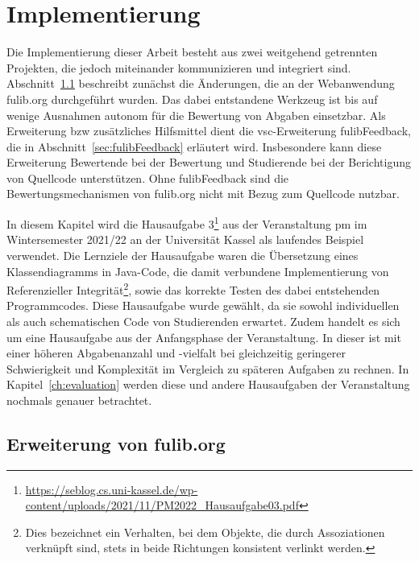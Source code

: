 \chapter{Implementierung}\label{ch:implementation}

Die Implementierung dieser Arbeit besteht aus zwei weitgehend getrennten Projekten, die jedoch miteinander kommunizieren und integriert sind.
Abschnitt~\ref{sec:expanding-fulib.org} beschreibt zunächst die Änderungen, die an der Webanwendung fulib.org durchgeführt wurden.
Das dabei entstandene Werkzeug ist bis auf wenige Ausnahmen autonom für die Bewertung von Abgaben einsetzbar.
Als Erweiterung \ac{bzw} zusätzliches Hilfsmittel dient die \ac{vsc}-Erweiterung fulibFeedback, die in Abschnitt~\ref{sec:fulibFeedback} erläutert wird.
Insbesondere kann diese Erweiterung Bewertende bei der Bewertung und Studierende bei der Berichtigung von Quellcode unterstützen.
Ohne fulibFeedback sind die Bewertungsmechanismen von fulib.org nicht mit Bezug zum Quellcode nutzbar.

In diesem Kapitel wird die Hausaufgabe 3\footnote{
    \url{https://seblog.cs.uni-kassel.de/wp-content/uploads/2021/11/PM2022_Hausaufgabe03.pdf}
} aus der Veranstaltung \ac{pm} im Wintersemester 2021/22 an der Universität Kassel als laufendes Beispiel verwendet.
Die Lernziele der Hausaufgabe waren die Übersetzung eines Klassendiagramms in Java-Code, die damit verbundene Implementierung von Referenzieller Integrität\footnote{
    Dies bezeichnet ein Verhalten, bei dem Objekte, die durch Assoziationen verknüpft sind, stets in beide Richtungen konsistent verlinkt werden.
}, sowie das korrekte Testen des dabei entstehenden Programmcodes.
Diese Hausaufgabe wurde gewählt, da sie sowohl individuellen als auch schematischen Code von Studierenden erwartet.
Zudem handelt es sich um eine Hausaufgabe aus der Anfangsphase der Veranstaltung.
In dieser ist mit einer höheren Abgabenanzahl und -vielfalt bei gleichzeitig geringerer Schwierigkeit und Komplexität im Vergleich zu späteren Aufgaben zu rechnen.
In Kapitel~\ref{ch:evaluation} werden diese und andere Hausaufgaben der Veranstaltung nochmals genauer betrachtet.

\section{Erweiterung von fulib.org}\label{sec:expanding-fulib.org}

